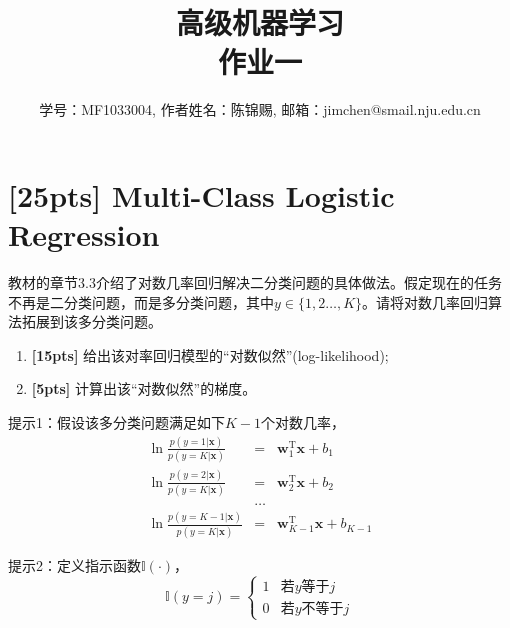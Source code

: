 \documentclass[a4paper,UTF8]{article}
\numberwithin{equation}{section}
\begin{document}
\title{高级机器学习\\
作业一}
\author{学号：MF1033004, 作者姓名：陈锦赐, 邮箱：jimchen@smail.nju.edu.cn}
\maketitle

\section{[25pts] Multi-Class Logistic Regression}
教材的章节3.3介绍了对数几率回归解决二分类问题的具体做法。假定现在的任务不再是二分类问题，而是多分类问题，其中$y\in\{1,2\dots,K\}$。请将对数几率回归算法拓展到该多分类问题。

\begin{enumerate}
	\item \textbf{[15pts]} 给出该对率回归模型的“对数似然”(log-likelihood);
	\item \textbf{[5pts]} 计算出该“对数似然”的梯度。
\end{enumerate}

提示1：假设该多分类问题满足如下$K-1$个对数几率，
\begin{eqnarray*}
	\ln\frac{p(y=1|\mathbf{x})}{p(y=K|\mathbf{x})}&=&\mathbf{w}_1^\mathrm{T}\mathbf{x}+b_1\\
	\ln\frac{p(y=2|\mathbf{x})}{p(y=K|\mathbf{x})}&=&\mathbf{w}_2^\mathrm{T}\mathbf{x}+b_2\\
	&\dots&\\
	\ln\frac{p(y={K-1}|\mathbf{x})}{p(y=K|\mathbf{x})}&=&\mathbf{w}_{K-1}^\mathrm{T}\mathbf{x}+b_{K-1}
\end{eqnarray*}

提示2：定义指示函数$\mathbb{I}(\cdot)$，
$$\mathbb{I}(y=j)=
\begin{cases}
1& \text{若$y$等于$j$}\\
0& \text{若$y$不等于$j$}
\end{cases}$$
\end{document}
